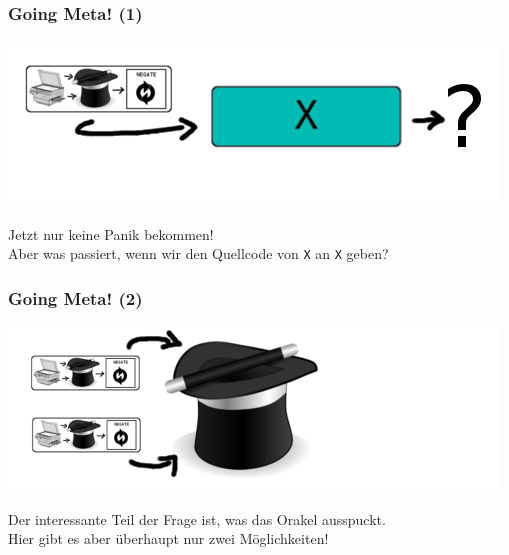 \documentclass[aspectratio=43]{beamer}
\begin{document}

\begin{frame}
\frametitle{Going Meta! (1)}
\begin{center}
\includegraphics[scale=1.4]{images/input.png} 
\bigskip

Jetzt nur keine Panik bekommen!\\

Aber was passiert, wenn wir den Quellcode von \texttt{X} an \texttt{X} geben?
\end{center}
\end{frame}


\begin{frame}
\frametitle{Going Meta! (2)}

\begin{center}
\includegraphics[scale=1.4]{images/input_hat_nothing.png} 
\bigskip

Der interessante Teil der Frage ist, was das Orakel ausspuckt.\\
Hier gibt es aber überhaupt nur zwei Möglichkeiten!
\end{center}
\end{frame}

\end{document}
